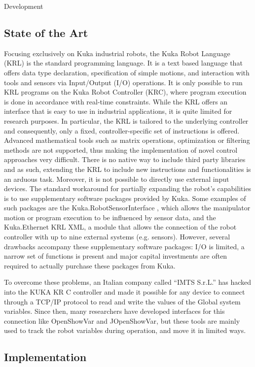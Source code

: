 \documentclass[a4paper]{book}
\begin{document}
\begin{chapter}{Development}
\subsection{State of the Art }
Focusing exclusively on Kuka industrial robots, the Kuka Robot Language (KRL) is the standard programming language. It is a text based language that offers data type declaration,  specification of simple motions, and interaction with tools and sensors via Input/Output (I/O) operations. It is only possible to run KRL programs on the Kuka Robot Controller (KRC), where program execution is done in accordance with real-time constraints. 
While the KRL offers an interface that is easy to use in industrial applications, it is quite limited for research purposes. In particular, the KRL is tailored to the underlying controller and consequently, only a fixed, controller-specific set of instructions is offered. Advanced mathematical tools such as matrix operations, optimization or filtering methods are not supported, thus making the implementation of novel control approaches very difficult. There is no native way to include third party libraries and as such, extending the KRL to include new instructions and functionalities is an arduous task. Moreover, it is not possible to directly use external input devices. 
The standard workaround for partially expanding the robot’s capabilities is to use supplementary software packages provided by Kuka. Some examples of such packages are the Kuka.RobotSensorInterface , which allows the manipulator motion or program execution to be influenced by sensor data, and the Kuka.Ethernet KRL XML, a module that allows the connection of the robot controller with up to nine external systems (e.g. sensors). However, several drawbacks accompany these supplementary software packages: I/O is limited, a narrow set of functions is present and major capital investments are often required to actually purchase these packages from Kuka.

To overcome these problems, an Italian company called “IMTS S.r.L.” has hacked into the KUKA KR C controller and made it possible for any device to connect through a TCP/IP protocol to read and write the values of the Global system variables. Since then, many researchers have developed interfaces for this connection like OpenShowVar and JOpenShowVar, but these tools are mainly used to track the robot variables during operation, and move it in limited ways.
\subsection{Implementation}


\end{chapter}
\end{document}
